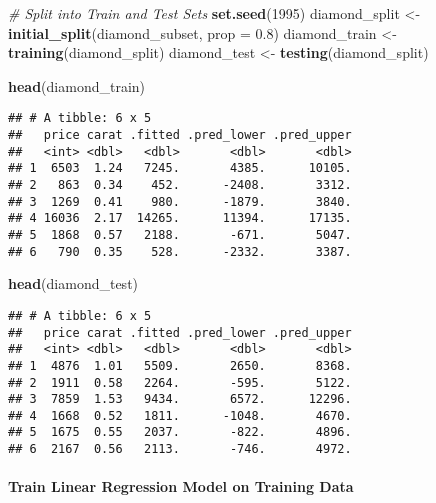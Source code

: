 \documentclass[
]{article}
\newenvironment{Shaded}{\begin{snugshade}}{\end{snugshade}}
\newcommand{\AttributeTok}[1]{\textcolor[rgb]{0.13,0.29,0.53}{#1}}
\newcommand{\CommentTok}[1]{\textcolor[rgb]{0.56,0.35,0.01}{\textit{#1}}}
\newcommand{\DecValTok}[1]{\textcolor[rgb]{0.00,0.00,0.81}{#1}}
\newcommand{\FloatTok}[1]{\textcolor[rgb]{0.00,0.00,0.81}{#1}}
\newcommand{\FunctionTok}[1]{\textcolor[rgb]{0.13,0.29,0.53}{\textbf{#1}}}
\newcommand{\NormalTok}[1]{#1}
\newcommand{\OtherTok}[1]{\textcolor[rgb]{0.56,0.35,0.01}{#1}}
\begin{document}
\begin{Shaded}
\begin{Highlighting}[]
\CommentTok{\# Split into Train and Test Sets}
\FunctionTok{set.seed}\NormalTok{(}\DecValTok{1995}\NormalTok{)}
\NormalTok{diamond\_split }\OtherTok{\textless{}{-}} \FunctionTok{initial\_split}\NormalTok{(diamond\_subset, }\AttributeTok{prop =} \FloatTok{0.8}\NormalTok{)}
\NormalTok{diamond\_train }\OtherTok{\textless{}{-}} \FunctionTok{training}\NormalTok{(diamond\_split)}
\NormalTok{diamond\_test }\OtherTok{\textless{}{-}} \FunctionTok{testing}\NormalTok{(diamond\_split)}
\end{Highlighting}
\end{Shaded}

\begin{Shaded}
\begin{Highlighting}[]
\FunctionTok{head}\NormalTok{(diamond\_train)}
\end{Highlighting}
\end{Shaded}

\begin{verbatim}
## # A tibble: 6 x 5
##   price carat .fitted .pred_lower .pred_upper
##   <int> <dbl>   <dbl>       <dbl>       <dbl>
## 1  6503  1.24   7245.       4385.      10105.
## 2   863  0.34    452.      -2408.       3312.
## 3  1269  0.41    980.      -1879.       3840.
## 4 16036  2.17  14265.      11394.      17135.
## 5  1868  0.57   2188.       -671.       5047.
## 6   790  0.35    528.      -2332.       3387.
\end{verbatim}

\begin{Shaded}
\begin{Highlighting}[]
\FunctionTok{head}\NormalTok{(diamond\_test)}
\end{Highlighting}
\end{Shaded}

\begin{verbatim}
## # A tibble: 6 x 5
##   price carat .fitted .pred_lower .pred_upper
##   <int> <dbl>   <dbl>       <dbl>       <dbl>
## 1  4876  1.01   5509.       2650.       8368.
## 2  1911  0.58   2264.       -595.       5122.
## 3  7859  1.53   9434.       6572.      12296.
## 4  1668  0.52   1811.      -1048.       4670.
## 5  1675  0.55   2037.       -822.       4896.
## 6  2167  0.56   2113.       -746.       4972.
\end{verbatim}

\paragraph{Train Linear Regression Model on Training
Data}\label{train-linear-regression-model-on-training-data}
\end{document}
